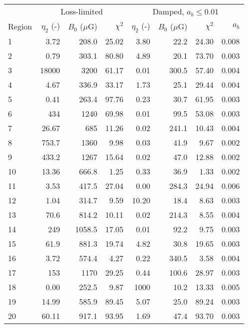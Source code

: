 \begin{tabular}{@{} l rrr rrrr @{}}
\toprule
{} & \multicolumn{3}{c}{Loss-limited}
   & \multicolumn{4}{c}{Damped, $a_b \leq 0.01$} \\
\cmidrule(lr){2-4} \cmidrule(l){5-8}
Region & $\eta_2$ (-) & $B_0$ ($\mu$G) & $\chi^2$
       & $\eta_2$ (-) & $B_0$ ($\mu$G) & $\chi^2$ & $a_b$ \\
\midrule
 1 &  3.72 & 208.0 & 25.02 & 3.80 & 22.2 & 24.30 & 0.008 \\
 2 &  0.79 & 303.1 & 80.80 & 4.89 & 20.1 & 73.70 & 0.003 \\
 3 & 18000 & 3200  & 61.17 & 0.01 & 300.5 & 57.40 & 0.004 \\
\cmidrule{1-8}
 4 &  4.67 & 336.9 & 33.17 & 1.73 & 25.1 & 29.44 & 0.004 \\
 5 &  0.41 & 263.4 & 97.76 & 0.23 & 30.7 & 61.95 & 0.003 \\
 6 &   434 & 1240  & 69.98 & 0.01 & 99.5 & 53.08 & 0.003 \\
 7 & 26.67 & 685   & 11.26 & 0.02 & 241.1 & 10.43 & 0.004 \\
 8 & 753.7 & 1360  & 9.98  & 0.03 & 41.9 & 9.67 & 0.002 \\
 9 & 433.2 & 1267  & 15.64 & 0.02 & 47.0 & 12.88 & 0.002 \\
10 & 13.36 & 666.8 & 1.25  & 0.33 & 36.9 & 1.33 & 0.002 \\
\cmidrule{1-8}
11 & 3.53 & 417.5  & 27.04 & 0.00 & 284.3 & 24.94 & 0.006 \\
12 & 1.04 & 314.7  & 9.59  & 10.20 & 18.4 & 8.63 & 0.003 \\
13 & 70.6 & 814.2  & 10.11 & 0.02 & 214.3 & 8.55 & 0.004 \\
\cmidrule{1-8}
14 &  249 & 1058.5 & 17.05 & 0.01 & 92.2 & 9.75 & 0.003 \\
15 & 61.9 & 881.3  & 19.74 & 4.82 & 30.8 & 19.65 & 0.003 \\
16 & 3.72 & 574.4  & 4.27  & 0.22 & 340.5 & 3.58 & 0.004 \\
17 &  153 & 1170   & 29.25 & 0.44 & 100.6 & 28.97 & 0.003 \\
\cmidrule{1-8}
18 & 0.00 & 252.5  & 9.87  & 1000 & 10.2 & 13.33 & 0.005 \\
19 & 14.99 & 585.9 & 89.45 & 5.07 & 25.0 & 89.24 & 0.003 \\
20 & 60.11 & 917.1 & 93.95 & 1.69 & 47.4 & 93.70 & 0.003 \\
\bottomrule
\end{tabular}
